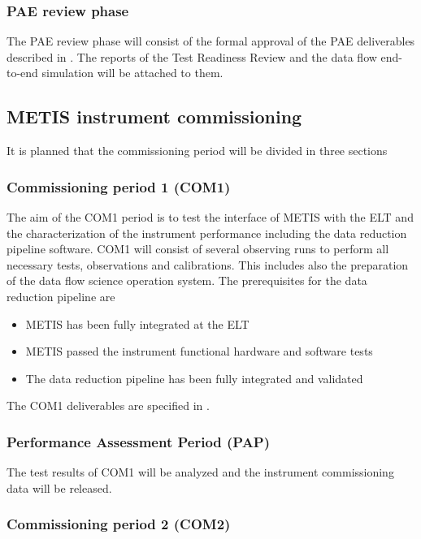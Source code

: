 \subsubsection{PAE review phase}
\label{sssec:paw_review}

The PAE review phase will consist of the formal approval of the PAE deliverables described in \cite{1618}. The reports of the Test Readiness Review and the data flow end-to-end simulation will be attached to them. 

\subsection{METIS instrument commissioning}
\label{ssec:com}

It is planned that the commissioning period will be divided in three sections

\subsubsection{Commissioning period 1 (COM1)}
\label{ssec:com1}

The aim of the COM1 period is to test the interface of METIS with the ELT and the characterization of the instrument performance including the data reduction pipeline software. COM1 will consist of several observing runs to perform all necessary tests, observations and calibrations. This includes also the preparation of the data flow science operation system. The prerequisites for the data reduction pipeline are
\begin{itemize}
    \item METIS has been fully integrated at the ELT
    \item METIS passed the instrument functional hardware and software tests
    \item The data reduction pipeline  has been fully integrated and validated
\end{itemize}
The COM1 deliverables are specified in \cite{1618}.

\subsubsection{Performance Assessment Period (PAP)}
\label{ssec:pap}

The test results of COM1 will be analyzed and the instrument commissioning data will be released.

\subsubsection{Commissioning period 2 (COM2)}
\label{ssec:com2}

